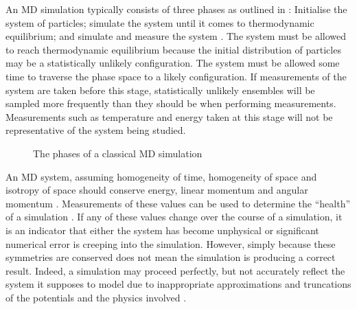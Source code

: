 %
An MD simulation typically consists of three phases as outlined in
:
Initialise the system of particles;
simulate the system until it comes to thermodynamic equilibrium; and
simulate and measure the system
\cite[p.~394]{schlick2010molecular}.
%
The system must be allowed to reach thermodynamic equilibrium because
the initial distribution of particles may be a statistically unlikely
configuration.
%
The system must be allowed some time to traverse the phase space to
a likely configuration.
%
If measurements of the system are taken before this stage,
statistically unlikely ensembles will be sampled more frequently than
they should be when performing measurements.
%
Measurements such as
temperature and energy
taken at this stage will not be
representative of the system being studied.

\begin{figure}
    \begin{center}
    \end{center}
    \caption{The phases of a classical MD simulation}
    \label{fig:phases_of_md_simulation}
\end{figure}


%
An MD system,
assuming homogeneity of time,
homogeneity of space and
isotropy of space
should conserve energy, linear momentum and angular momentum
\cite{noether1918invariante} \cite{landau1976mechanics}.
%
Measurements of these values can be used to
determine the ``health'' of a simulation
\cite[p.~72]{frenkel2001understanding}.
%
If any of these values change over the course of a simulation,
it is an indicator that either the system has become unphysical or
significant numerical error is creeping into the simulation.
%
However, simply because these symmetries are conserved does not mean
the simulation is producing a correct result.
%
Indeed, a simulation may proceed perfectly, but not accurately reflect
the system it supposes to model due to
inappropriate approximations and truncations of
the potentials and the physics involved
\cite{patra2003molecular}.




